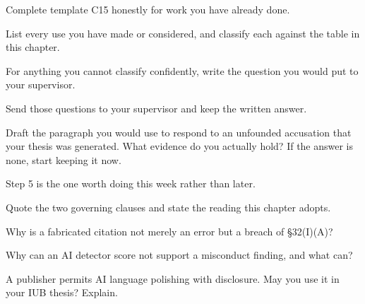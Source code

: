 \begin{lab}
\begin{tightnum}
  \item Complete template C15 honestly for work you have already done.
  \item List every use you have made or considered, and classify each against
    the table in this chapter.
  \item For anything you cannot classify confidently, write the question you
    would put to your supervisor.
  \item Send those questions to your supervisor and keep the written answer.
  \item Draft the paragraph you would use to respond to an unfounded accusation
    that your thesis was generated. What evidence do you actually hold? If the
    answer is none, start keeping it now.
\end{tightnum}

\medskip
Step 5 is the one worth doing this week rather than later.
\end{lab}

\begin{checkpoint}
\begin{tightnum}
  \item Quote the two governing clauses and state the reading this chapter
    adopts.
  \item Why is a fabricated citation not merely an error but a breach of
    \S32(I)(A)?
  \item Why can an AI detector score not support a misconduct finding, and what
    can?
  \item A publisher permits AI language polishing with disclosure. May you use
    it in your IUB thesis? Explain.
\end{tightnum}
\end{checkpoint}


